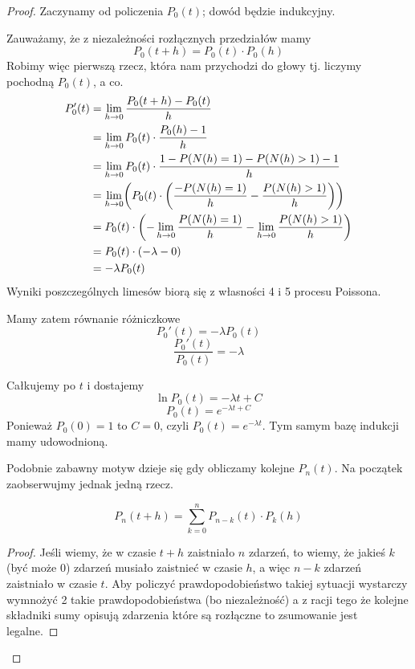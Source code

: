 \begin{proof}
	Zaczynamy od policzenia \( P_0(t) \); dowód będzie indukcyjny.

	Zauważamy, że z niezależności rozłącznych przedziałów mamy
	\[
		P_0(t + h) = P_0(t) \cdot P_0(h)
	\]
	Robimy więc pierwszą rzecz, która nam przychodzi do głowy tj. liczymy pochodną \( P_0(t) \), a co.
	\begin{align*}
		P_0'(t)
		 & = \lim_{h \rightarrow 0} \frac{P_0(t + h) - P_0(t)}{h}                                                             \\
		 & = \lim_{h \rightarrow 0} P_0(t) \cdot \frac{P_0(h) - 1}{h}                                                         \\
		 & = \lim_{h \rightarrow 0} P_0(t) \cdot \frac{1 - P(N(h) = 1) - P(N(h)  > 1) - 1}{h}                                 \\
		 & = \lim_{h \rightarrow 0} \pars{ P_0(t) \cdot \pars{ \frac{- P(N(h) = 1)}{h} - \frac{P(N(h) > 1)}{h}}}              \\
		 & = P_0(t) \cdot \pars{-\lim_{h \rightarrow 0} \frac{P(N(h) = 1)}{h} - \lim_{h \rightarrow 0} \frac{P(N(h) > 1)}{h}} \\
		 & = P_0(t) \cdot \pars{-\lambda - 0}                                                                                 \\
		 & = -\lambda P_0(t)
	\end{align*}
	Wyniki poszczególnych limesów biorą się z własności 4 i 5 procesu Poissona.

	Mamy zatem równanie różniczkowe
	\[
		P_0'(t) = -\lambda P_0(t)
	\]
	\[
		\frac{P_0'(t)}{P_0(t)} = -\lambda
	\]

	Całkujemy po \( t \) i dostajemy
	\[
		\ln P_0(t) = -\lambda t + C
	\]
	\[
		P_0(t) = e^{-\lambda t + C}
	\]
	Ponieważ \( P_0(0) = 1 \) to \( C = 0\), czyli \( P_0(t) = e^{-\lambda t} \). Tym samym bazę indukcji mamy udowodnioną.

	Podobnie zabawny motyw dzieje się gdy obliczamy kolejne \( P_n(t) \). Na początek zaobserwujmy jednak jedną rzecz.

	\begin{fact}
		\[ P_{n}(t+h) = \sum_{k=0}^{n} P_{n-k}(t) \cdot P_k(h) \]
	\end{fact}
	\begin{proof}
		Jeśli wiemy, że w czasie \(t + h\) zaistniało \(n\) zdarzeń, to wiemy, że jakieś \(k\) (być może \(0\)) zdarzeń musiało zaistnieć w czasie \(h\), a więc \(n - k\) zdarzeń zaistniało w czasie \(t\). Aby policzyć prawdopodobieństwo takiej sytuacji wystarczy wymnożyć 2 takie prawdopodobieństwa (bo niezależność) a z racji tego że kolejne składniki sumy opisują zdarzenia które są rozłączne to zsumowanie jest legalne.
	\end{proof}


\end{proof}
